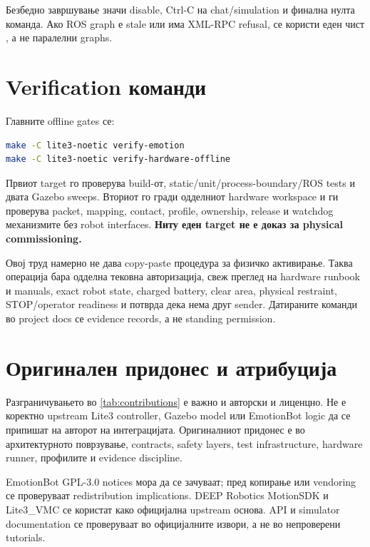 Безбедно завршување значи disable, Ctrl-C на chat/simulation и финална нулта
команда. Ако ROS graph е stale или има XML-RPC refusal, се користи еден чист
, а не паралелни graphs.

\section{Verification команди}

Главните offline gates се:

\begin{lstlisting}[language=bash,caption={Repeatable verification targets}]
make -C lite3-noetic verify-emotion
make -C lite3-noetic verify-hardware-offline
\end{lstlisting}

Првиот target го проверува build-от, static/unit/process-boundary/ROS tests и
двата Gazebo sweeps. Вториот го гради одделниот hardware workspace и ги
проверува packet, mapping, contact, profile, ownership, release и watchdog
механизмите без robot interfaces. \textbf{Ниту еден target не е доказ за
physical commissioning.}

Овој труд намерно не дава copy-paste процедура за физичко активирање. Таква
операција бара одделна тековна авторизација, свеж преглед на hardware runbook и
manuals, exact robot state, charged battery, clear area, physical restraint,
STOP/operator readiness и потврда дека нема друг sender. Датираните команди во
project docs се evidence records, а не standing permission.

\section{Оригинален придонес и атрибуција}

Разграничувањето во \cref{tab:contributions} е важно и авторски и лиценцно.
Не е коректно upstream Lite3 controller, Gazebo model или EmotionBot logic да
се припишат на авторот на интеграцијата. Оригиналниот придонес е во
архитектурното поврзување, contracts, safety layers, test infrastructure,
hardware runner, профилите и evidence discipline.



EmotionBot GPL-3.0 notices мора да се зачуваат; пред копирање или vendoring се
проверуваат redistribution implications. DEEP Robotics MotionSDK и Lite3\_VMC
се користат како официјална upstream основа. API и simulator documentation се
проверуваат во официјалните извори, а не во непроверени tutorials.

